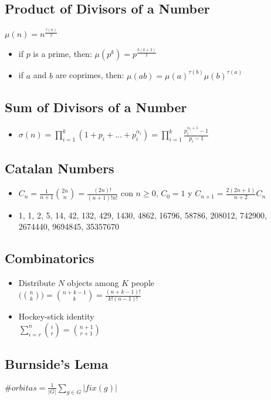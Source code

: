 \documentclass[10pt,letterpaper,twocolumn,twosided]{article}
\begin{document}
\subsection{Product of Divisors of a Number}
$\mu(n) = n^{\frac{\tau(n)}{2}}$
\begin{itemize}
\item if $p$ is a prime, then: $\mu(p^k) = p^{\frac{k(k+2)}{2}}$
\item if $a$ and $b$ are coprimes, then: $\mu(ab) = \mu(a)^{\tau(b)}\mu(b)^{\tau(a)}$
\end{itemize}

\subsection{Sum of Divisors of a Number}
\begin{itemize}
    \item $\sigma(n) = \prod_{i=1}^{k}(1 + p_{i} + ... + p_{i}^{\alpha_i}) = \prod_{i=1}^{k}\frac{p_{i}^{\alpha_i + 1} - 1}{p_i - 1}$
\end{itemize}


\subsection{Catalan Numbers}
\begin{itemize}
    \item $C_n = \frac{1}{n+1} \binom{2n}{n} = \frac{(2n)!}{(n+1)!n!}$ con $n \geq 0$, $C_0 = 1$ y $C_{n+1} = \frac{2(2n + 1)}{n + 2} C_{n}$
    \item 1, 1, 2, 5, 14, 42, 132, 429, 1430, 4862, 16796, 58786, 208012, 742900, 2674440, 9694845, 35357670
\end{itemize}


\subsection{Combinatorics}
\begin{itemize}
\item Distribute $N$ objects among $K$ people	\\
$\big(\binom{n}{k}\big) = \binom{n + k -1}{k} = \frac{(n + k - 1)!}{k!(n-1)!}$
\item Hockey-stick identity \\
$\sum_{i=r}^{n}\binom{i}{r} = \binom{n+1}{r+1}$
\end{itemize}


\subsection{Burnside's Lema}
$\#orbitas = \frac{1}{|G|}\sum_{g \in G}|fix(g)|$
\end{document}

